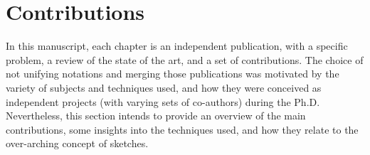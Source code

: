  \section{Contributions}\label{intro:sec:contrib}

In this manuscript, each chapter is  an independent publication, with a specific problem, a review of the state of the art, and a set of contributions. The choice of not unifying notations and merging those publications was motivated by the variety of subjects and techniques used, and how they were conceived as independent projects (with varying sets of co-authors) during the Ph.D. Nevertheless, this section intends to provide an overview of the main contributions, some insights into the techniques used, and how they relate to the over-arching concept of sketches.


